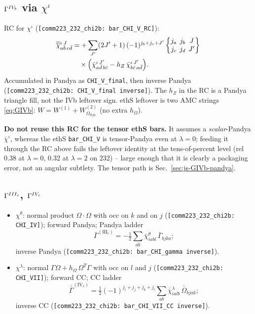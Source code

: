 \documentclass[enabledeprecatedfontcommands]{scrartcl}
\newcommand{\codename}[1]{\texttt{#1}}
\newcommand{\coderef}[1]{\textcolor{codeblue}{\texttt{[#1]}}}
\newcommand{\MyRomanNum}[1]{%
  \ifcase#1\or I\or II\or III\or IV\or V\or VI\or VII\or VIII\or IX\or X\else #1\fi}
\newcommand{\sixj}[6]{\begingroup\setlength{\arraycolsep}{0.2em}%
  \begin{Bmatrix} #1 & #2 & #3 \\ #4 & #5 & #6 \end{Bmatrix}\endgroup}
\begin{document}
\subsection{$\Gamma^{\MyRomanNum{4}_b}$ via $\chi^\iota$}
\label{sec:code-GIVb}

RC for $\chi^\iota$ (\coderef{comm223\_232\_chi2b: bar\_CHI\_V\_RC}):
\begin{equation}
\begin{aligned}
\overline{\overline\chi}{}^{\iota\,J}_{a\bar b\,c\bar d}
&=+\sum_{J'}(2J'+1)\,(-1)^{j_b+j_c+J'}
  \sixj{j_a}{j_b}{J}{j_c}{j_d}{J'}\\
&\quad\times\Bigl(
  \bar\chi^{\iota\,J'}_{a\bar d\,b\bar c}
 -h_Z\,\bar\chi^{\iota\,J'}_{b\bar c\,a\bar d}
\Bigr).
\end{aligned}
\end{equation}
Accumulated in Pandya as \codename{CHI\_V\_final}, then inverse Pandya
(\coderef{comm223\_232\_chi2b: CHI\_V\_final inverse}). The $h_Z$ in the RC is a Pandya triangle fill,
not the IVb leftover sign.
ethS leftover is two AMC strings \eqref{eq:GIVb}:
$W=W^{(1)}+W^{(2)}_{\Omega_{lbja}}$ (no extra $h_\Omega$).

\textbf{Do not reuse this RC for the tensor ethS bars.} It assumes a
\emph{scalar}-Pandya $\bar\chi^\iota$, whereas the ethS
\codename{bar\_CHI\_V} is tensor-Pandya even at $\lambda=0$; feeding it
through the RC above fails the leftover identity at the tens-of-percent
level (rel $0.38$ at $\lambda=0$, $0.32$ at $\lambda=2$ on $232$) --
large enough that it is clearly a packaging error, not an angular
subtlety. The tensor path is Sec.~\ref{sec:js-GIVb-pandya}.

\subsection{$\Gamma^{\MyRomanNum{3}_c}$, $\Gamma^{\MyRomanNum{4}_c}$}
\label{sec:code-rest}

\begin{itemize}
  \item $\chi^\theta$: normal product
    $\Omega\cdot\Omega$ with occ on $k$ and on $j$
    (\coderef{comm223\_232\_chi2b: CHI\_IV}); forward Pandya; Pandya ladder
    \[
      \bar\Gamma^{(\mathrm{III}_c)}
      =-\tfrac12\sum_{ab}
        \bar\chi^{\theta}_{iabl}\,\bar\Gamma_{bjka};
    \]
    inverse Pandya (\coderef{comm223\_232\_chi2b: bar\_CHI\_gamma inverse}).
  \item $\chi^\lambda$: normal
    $\Gamma\Omega+h_\Omega\,\Omega^{T}\Gamma$ with occ on $l$ and $j$
    (\coderef{comm223\_232\_chi2b: CHI\_VII}); forward CC; CC ladder
    \[
      \overline{\overline\Gamma}^{(\mathrm{IV}_c)}
      =\tfrac12(-1)^{j_i+j_j+j_k+j_l}
        \sum_{ab}
        \overline{\overline\chi}{}^{\lambda}_{ialb}\,
        \overline{\overline\Omega}_{bjak};
    \]
    inverse CC (\coderef{comm223\_232\_chi2b: bar\_CHI\_VII\_CC inverse}).
\end{itemize}
\end{document}
